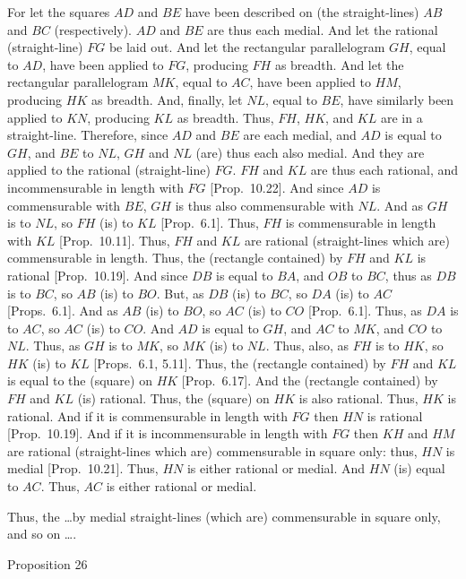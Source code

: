 For let the squares $AD$ and $BE$ have been described on (the straight-lines) $AB$ and
$BC$ (respectively). $AD$ and $BE$ are thus each medial. And let
the rational (straight-line) $FG$ be laid out. And let the rectangular parallelogram $GH$, equal to $AD$, have been applied to $FG$, producing
$FH$ as breadth. And let the rectangular parallelogram $MK$, equal to $AC$, have been applied to $HM$, producing $HK$ as breadth. And,
finally, let $NL$, equal to $BE$, have similarly been applied to $KN$,
producing $KL$ as breadth. Thus, $FH$, $HK$, and $KL$ are in
a straight-line.  Therefore, since $AD$ and $BE$ are each medial, and
$AD$ is equal to $GH$, and $BE$ to $NL$, $GH$ and $NL$ (are)
thus each also medial. And they are applied to the rational (straight-line)
$FG$. $FH$ and $KL$ are thus each rational, and incommensurable in length
with $FG$ [Prop.~10.22]. And since
$AD$ is commensurable with $BE$, $GH$ is thus also commensurable
with $NL$. And as $GH$ is to $NL$, so $FH$ (is) to $KL$ [Prop.~6.1]. Thus, $FH$ is commensurable
in length with $KL$ [Prop.~10.11]. Thus, 
$FH$ and $KL$ are rational (straight-lines which are) commensurable in length. Thus, the (rectangle contained) by $FH$ and $KL$ is rational
[Prop.~10.19]. And since $DB$ is equal to $BA$,
and $OB$ to $BC$, thus as $DB$ is to $BC$, so $AB$ (is) to $BO$.
But, as $DB$ (is) to $BC$, so $DA$ (is) to $AC$ [Props.~6.1]. 
And as $AB$ (is) to $BO$, so $AC$ (is)
to $CO$ [Prop.~6.1]. Thus, as $DA$ is to $AC$, so $AC$ (is)
to $CO$. And $AD$ is equal to $GH$,
and $AC$ to $MK$, and $CO$ to $NL$. Thus, as $GH$ is to $MK$,
so $MK$ (is) to $NL$. Thus, also, as $FH$ is to $HK$, so $HK$ (is) to
$KL$ [Props.~6.1, 5.11]. Thus, the (rectangle contained) by
$FH$ and $KL$ is equal to the (square) on $HK$ [Prop.~6.17]. And the (rectangle contained) by
$FH$ and $KL$ (is) rational. Thus, the (square) on $HK$ is also
rational. Thus, $HK$ is rational. And if it is commensurable in length with
$FG$ then $HN$ is rational [Prop.~10.19]. 
And if it is incommensurable in length with $FG$ then $KH$ and $HM$
are rational (straight-lines which are) commensurable in square only: thus,
$HN$ is medial [Prop.~10.21]. Thus, $HN$ is
either rational or medial. And $HN$ (is) equal to $AC$. Thus, $AC$
is either rational or medial.

Thus, the \ldots by medial
straight-lines (which are) commensurable in square only, and so on \ldots.


\begin{center}
{\large Proposition 26}
\end{center}

